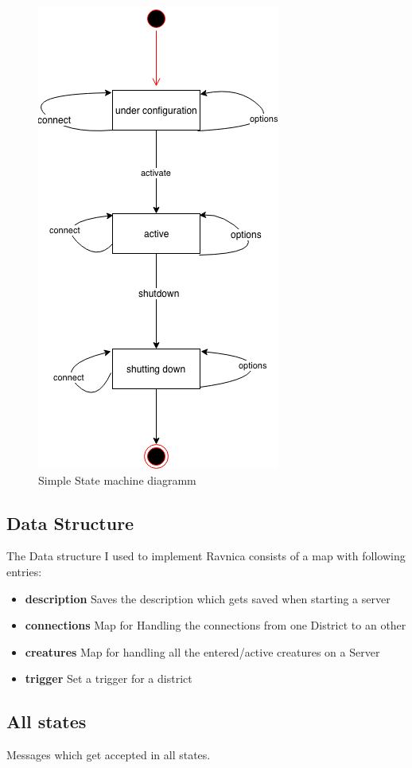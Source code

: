 \documentclass[11pt,a4paper]{article}
\begin{document}
\begin{figure}[!htb]
	\includegraphics{images/ravnica}
	\caption{Simple State machine diagramm}
\end{figure}

\subsection{Data Structure}
The Data structure I used to implement Ravnica consists of a map with following entries:
\begin{itemize}
	\item \textbf{description} Saves the description which gets saved when starting a server
	\item \textbf{connections} Map for Handling the connections from one District to an other
	\item \textbf{creatures} Map for handling all the entered/active creatures on a Server
	\item \textbf{trigger} Set a trigger for a district
\end{itemize}

\subsection{All states}
Messages which get accepted in all states.
\end{document}
